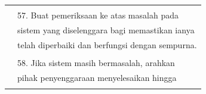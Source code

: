 \documentclass[
]{article}
\begin{document}
\begin{longtable}[]{@{}ll@{}}
\begin{minipage}[t]{0.23\columnwidth}\raggedright
\strut
\end{minipage} & \begin{minipage}[t]{0.71\columnwidth}\raggedright
\strut
\end{minipage}\tabularnewline
\begin{minipage}[t]{0.23\columnwidth}\raggedright
\strut
\end{minipage} & \begin{minipage}[t]{0.71\columnwidth}\raggedright
57. Buat pemeriksaan ke atas masalah pada\strut
\end{minipage}\tabularnewline
\begin{minipage}[t]{0.23\columnwidth}\raggedright
\strut
\end{minipage} & \begin{minipage}[t]{0.71\columnwidth}\raggedright
sistem yang diselenggara bagi memastikan ianya\strut
\end{minipage}\tabularnewline
\begin{minipage}[t]{0.23\columnwidth}\raggedright
\strut
\end{minipage} & \begin{minipage}[t]{0.71\columnwidth}\raggedright
telah diperbaiki dan berfungsi dengan sempurna.\strut
\end{minipage}\tabularnewline
\begin{minipage}[t]{0.23\columnwidth}\raggedright
\strut
\end{minipage} & \begin{minipage}[t]{0.71\columnwidth}\raggedright
\strut
\end{minipage}\tabularnewline
\begin{minipage}[t]{0.23\columnwidth}\raggedright
\strut
\end{minipage} & \begin{minipage}[t]{0.71\columnwidth}\raggedright
58. Jika sistem masih bermasalah, arahkan\strut
\end{minipage}\tabularnewline
\begin{minipage}[t]{0.23\columnwidth}\raggedright
\strut
\end{minipage} & \begin{minipage}[t]{0.71\columnwidth}\raggedright
pihak penyenggaraan menyelesaikan hingga\strut
\end{minipage}\tabularnewline
\begin{minipage}[t]{0.23\columnwidth}\raggedright
\strut
\end{minipage} & \begin{minipage}[t]{0.71\columnwidth}\raggedright

\end{minipage}
\end{longtable}
\end{document}
